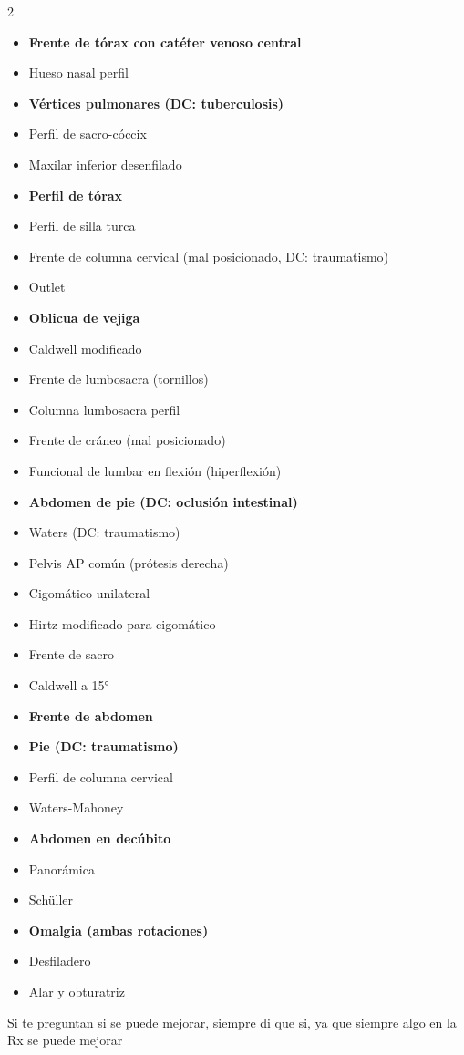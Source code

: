 \begin{multicols}{2}
\begin{itemize}
    \item \textbf{Frente de tórax con catéter venoso central}
    \item Hueso nasal perfil
    \item \textbf{Vértices pulmonares (DC: tuberculosis)}
    \item Perfil de sacro-cóccix
    \item Maxilar inferior desenfilado
    \item \textbf{Perfil de tórax}
    \item Perfil de silla turca
    \item Frente de columna cervical (mal posicionado, DC: traumatismo)
    \item Outlet
    \item \textbf{Oblicua de vejiga}
    \item Caldwell modificado
    \item Frente de lumbosacra (tornillos)
    \item Columna lumbosacra perfil
    \item Frente de cráneo (mal posicionado)
    \item Funcional de lumbar en flexión (hiperflexión)
    \item \textbf{Abdomen de pie (DC: oclusión intestinal)}
    \item Waters (DC: traumatismo)
    \item Pelvis AP común (prótesis derecha)
    \item Cigomático unilateral
    \item Hirtz modificado para cigomático
    \item Frente de sacro
    \item Caldwell a 15°
    \item \textbf{Frente de abdomen}
    \item \textbf{Pie (DC: traumatismo)}
    \item Perfil de columna cervical
    \item Waters-Mahoney
    \item \textbf{Abdomen en decúbito}
    \item Panorámica
    \item Schüller
    \item \textbf{Omalgia (ambas rotaciones)}
    \item Desfiladero
    \item Alar y obturatriz
\end{itemize}
\end{multicols}

\begin{tcolorbox}[colback=red!10, colframe=red, title=Importante]
Si te preguntan si se puede mejorar, siempre di que si, ya que siempre algo en la Rx se puede mejorar
\end{tcolorbox}